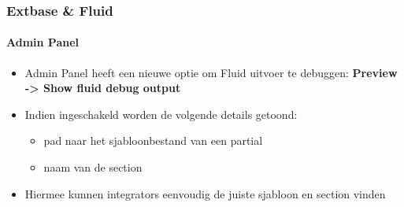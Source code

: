 \begin{frame}[fragile]
	\frametitle{Extbase \& Fluid}
	\framesubtitle{Admin Panel}

	\begin{itemize}
		\item Admin Panel heeft een nieuwe optie om Fluid uitvoer te debuggen:\newline
			\textbf{Preview -> Show fluid debug output}
		\item Indien ingeschakeld worden de volgende details getoond:

			\begin{itemize}
				\item pad naar het sjabloonbestand van een partial
				\item naam van de section
			\end{itemize}

		\item Hiermee kunnen integrators eenvoudig de juiste sjabloon en section vinden

	\end{itemize}

\end{frame}

